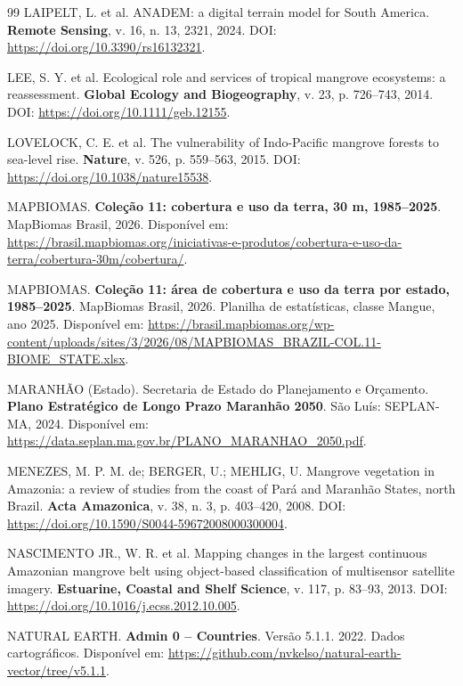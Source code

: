 \documentclass[12pt,a4paper]{article}
\begin{document}
\begin{thebibliography}{99}
LAIPELT, L. et al. ANADEM: a digital terrain model for South America. \textbf{Remote Sensing}, v. 16, n. 13, 2321, 2024. DOI: \url{https://doi.org/10.3390/rs16132321}.

LEE, S. Y. et al. Ecological role and services of tropical mangrove ecosystems: a reassessment. \textbf{Global Ecology and Biogeography}, v. 23, p. 726--743, 2014. DOI: \url{https://doi.org/10.1111/geb.12155}.

LOVELOCK, C. E. et al. The vulnerability of Indo-Pacific mangrove forests to sea-level rise. \textbf{Nature}, v. 526, p. 559--563, 2015. DOI: \url{https://doi.org/10.1038/nature15538}.

MAPBIOMAS. \textbf{Coleção 11: cobertura e uso da terra, 30 m, 1985--2025}. MapBiomas Brasil, 2026. Disponível em: \url{https://brasil.mapbiomas.org/iniciativas-e-produtos/cobertura-e-uso-da-terra/cobertura-30m/cobertura/}.

MAPBIOMAS. \textbf{Coleção 11: área de cobertura e uso da terra por estado, 1985--2025}. MapBiomas Brasil, 2026. Planilha de estatísticas, classe Mangue, ano 2025. Disponível em: \url{https://brasil.mapbiomas.org/wp-content/uploads/sites/3/2026/08/MAPBIOMAS_BRAZIL-COL.11-BIOME_STATE.xlsx}.

MARANHÃO (Estado). Secretaria de Estado do Planejamento e Orçamento. \textbf{Plano Estratégico de Longo Prazo Maranhão 2050}. São Luís: SEPLAN-MA, 2024. Disponível em: \url{https://data.seplan.ma.gov.br/PLANO_MARANHAO_2050.pdf}.

MENEZES, M. P. M. de; BERGER, U.; MEHLIG, U. Mangrove vegetation in Amazonia: a review of studies from the coast of Pará and Maranhão States, north Brazil. \textbf{Acta Amazonica}, v. 38, n. 3, p. 403--420, 2008. DOI: \url{https://doi.org/10.1590/S0044-59672008000300004}.

NASCIMENTO JR., W. R. et al. Mapping changes in the largest continuous Amazonian mangrove belt using object-based classification of multisensor satellite imagery. \textbf{Estuarine, Coastal and Shelf Science}, v. 117, p. 83--93, 2013. DOI: \url{https://doi.org/10.1016/j.ecss.2012.10.005}.

NATURAL EARTH. \textbf{Admin 0 -- Countries}. Versão 5.1.1. 2022. Dados cartográficos. Disponível em: \url{https://github.com/nvkelso/natural-earth-vector/tree/v5.1.1}.


\end{thebibliography}
\end{document}
